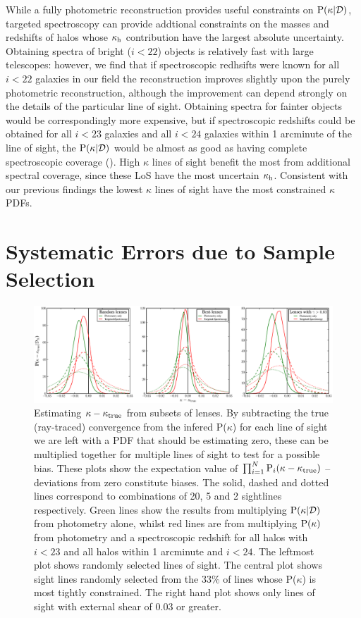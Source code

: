\documentclass[useAMS,usenatbib]{mn2e}
\begin{document}
While a fully photometric reconstruction provides useful constraints on
${\rm P}(\kappa|{\mathcal{D}})$, targeted spectroscopy can provide addtional constraints
on the masses and redshifts of halos whose $\kappa_{\rm h}$ contribution have the
largest absolute uncertainty. Obtaining spectra of bright ($i<22$) objects is
relatively fast with large telescopes: however, we find that if spectroscopic
redhsifts were known for all $i<22$ galaxies in our field the reconstruction
improves slightly upon the purely photometric reconstruction, although the
improvement can depend strongly on the details of the particular line of
sight. Obtaining spectra for fainter objects would be correspondingly more
expensive, but if spectroscopic redshifts could be obtained for all $i<23$
galaxies and all $i<24$ galaxies within 1 arcminute of the line of sight, the
${\rm P}(\kappa|{\mathcal{D}})$ would be almost as good as having complete spectroscopic
coverage (). High $\kappa$ lines of sight benefit the
most from additional spectral coverage, since these LoS have the most
uncertain $\kappa_{\rm h}$. Consistent with our previous findings the lowest $\kappa$
lines of sight have the most constrained $\kappa$ PDFs.



\section{Systematic Errors due to Sample Selection}
\label{sec:bias}

\begin{figure}
\includegraphics[width=\textwidth]{figs/biasplots.eps}
\caption{Estimating $\kappa-\kappa_{\rm true}$ from subsets of
lenses. By subtracting the true (ray-traced) convergence from the
infered P($\kappa$) for each line of sight we are left with a PDF that
should be estimating zero, these can be multiplied together for multiple
lines of sight to test for a possible bias. These plots show the
expectation value of $\prod_{i=1}^N {\rm P}_i(\kappa-\kappa_{\rm true})$ --
deviations from zero constitute biases. The solid, dashed and dotted
lines correspond to combinations of 
20, 5 and 2 sightlines respectively. Green lines show the results
from multiplying ${\rm P}(\kappa|{\mathcal{D}})$ \infered from photometry alone, whilst red
lines are from multiplying ${\rm P}(\kappa)$ \infered from photometry and a
spectroscopic redshift for all halos with $i<23$ and all halos within 1
arcminute and $i<24$. The leftmost plot shows randomly selected lines
of sight. The central plot shows sight lines randomly selected from the
33\% of lines whose P($\kappa$) is most tightly constrained. The right
hand plot shows only lines of sight with external shear of 0.03 or
greater.}
\label{fig:biasplots}
\end{figure}
\end{document}
